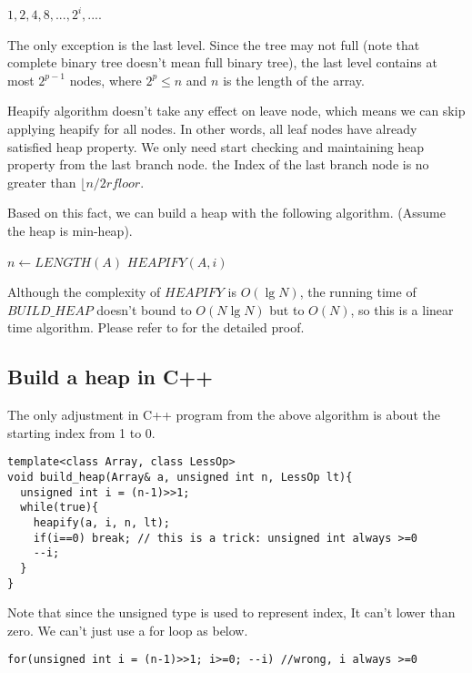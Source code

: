 \documentclass{article}
\begin{document}
$1, 2, 4, 8, ..., 2^i, ...$.

The only exception is the last level. Since the tree may not full
(note that complete binary tree doesn't mean full binary tree), the
last level contains at most $2^{p-1}$ nodes, where $2^p \leq n$ and $n$
is the length of the array.

Heapify algorithm doesn't take any effect on leave node, which means
we can skip applying heapify for all nodes. In other words,  
all leaf nodes have already satisfied heap property. We only need 
start checking and maintaining heap property from the last branch node.
the Index of the last branch node is no greater than $\lfloor n/2 rfloor$.

Based on this fact, we can build a heap with the following algorithm.
(Assume the heap is min-heap).

\begin{algorithmic}[1]
  \State $n \gets LENGTH(A)$
    \State $HEAPIFY(A, i)$
  \EndFor
\EndFunction
\end{algorithmic}

Although the complexity of $HEAPIFY$ is $O(\lg{N})$, the running time
of $BUILD\_HEAP$ doesn't bound to $O(N \lg{N})$ but to $O(N)$, so this
is a linear time algorithm. Please refer to \cite{CLRS} for the 
detailed proof.

\subsection*{Build a heap in C++}

The only adjustment in C++ program from the above algorithm is
about the starting index from 1 to 0. 

\lstset{language=C++}
\begin{lstlisting}
template<class Array, class LessOp>
void build_heap(Array& a, unsigned int n, LessOp lt){
  unsigned int i = (n-1)>>1;
  while(true){
    heapify(a, i, n, lt);
    if(i==0) break; // this is a trick: unsigned int always >=0
    --i;
  }
}
\end{lstlisting}

Note that since the unsigned type is used to represent index,
It can't lower than zero. We can't just use a for loop as below.

\begin{lstlisting}
for(unsigned int i = (n-1)>>1; i>=0; --i) //wrong, i always >=0
\end{lstlisting}
\end{document}

